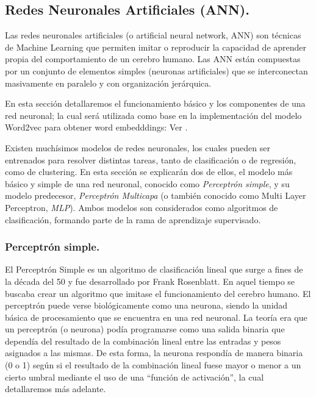 \documentclass[12pt,a4paper]{article}
\begin{document}
\begin{sloppypar}
\cleardoublepage
\subsection{Redes Neuronales Artificiales (ANN).}\label{ann_teoria}

Las redes neuronales artificiales (o artificial neural network, ANN) son técnicas de Machine Learning que permiten imitar o reproducir la capacidad de aprender propia del comportamiento de un cerebro humano. Las ANN están compuestas por un conjunto de elementos simples (neuronas artificiales) que se interconectan masivamente en paralelo y con organización jerárquica\cite{ANN_21}.

En esta sección detallaremos el funcionamiento básico y los componentes de una red neuronal; la cual será utilizada como base en la implementación del modelo Word2vec para obtener word embedddings: Ver \textit{}.

Existen muchísimos modelos de redes neuronales, los cuales pueden ser entrenados para resolver distintas tareas, tanto de clasificación o de regresión, como de clustering. En esta sección se explicarán dos de ellos, el modelo más básico y simple de una red neuronal, conocido como \textit{Perceptrón simple}, y su modelo predecesor, \textit{Perceptrón Multicapa} (o también conocido como Multi Layer Perceptron, \textit{MLP}). Ambos modelos son considerados como algoritmos de clasificación, formando parte de la rama de aprendizaje supervisado.

\subsubsection{Perceptrón simple.}

El Perceptrón Simple es un algoritmo de clasificación lineal que surge a fines de la década del 50 y fue desarrollado por Frank Rosenblatt. En aquel tiempo se buscaba crear un algoritmo que imitase el funcionamiento del cerebro humano. El perceptrón puede verse biológicamente como una neurona, siendo la unidad básica de procesamiento que se encuentra en una red neuronal. La teoría era que un perceptrón (o neurona) podía programarse como una salida binaria que dependía del resultado de la combinación lineal entre las entradas y pesos asignados a las mismas. De esta forma, la neurona respondía de manera binaria (0 o 1) según si el resultado de la combinación lineal fuese mayor o menor a un cierto umbral mediante el uso de una “función de activación”\cite{apunte_uba}, la cual detallaremos más adelante.


\end{sloppypar}
\end{document}
